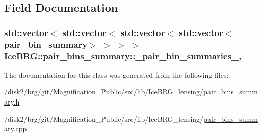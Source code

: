 \subsection{Field Documentation}
\hypertarget{classIceBRG_1_1pair__bins__summary_ae48646da7b9c9cb88fc5987a49152da0}{
\subsubsection[{\-\_\-pair\-\_\-bin\-\_\-summaries\-\_\-}]{\setlength{\rightskip}{0pt plus 5cm}std\-::vector$<$ std\-::vector$<$ std\-::vector$<$ std\-::vector$<${\bf pair\-\_\-bin\-\_\-summary}$>$ $>$ $>$ $>$ Ice\-B\-R\-G\-::pair\-\_\-bins\-\_\-summary\-::\-\_\-pair\-\_\-bin\-\_\-summaries\-\_\-\hspace{0.3cm}{\ttfamily [mutable]}, {\ttfamily [protected]}}}\label{classIceBRG_1_1pair__bins__summary_ae48646da7b9c9cb88fc5987a49152da0}


The documentation for this class was generated from the following files\-:\begin{DoxyCompactItemize}
\item 
/disk2/brg/git/\-Magnification\-\_\-\-Public/src/lib/\-Ice\-B\-R\-G\-\_\-lensing/\hyperlink{pair__bins__summary_8h}{pair\-\_\-bins\-\_\-summary.\-h}\item 
/disk2/brg/git/\-Magnification\-\_\-\-Public/src/lib/\-Ice\-B\-R\-G\-\_\-lensing/\hyperlink{pair__bins__summary_8cpp}{pair\-\_\-bins\-\_\-summary.\-cpp}\end{DoxyCompactItemize}
